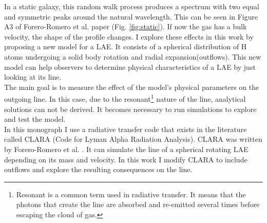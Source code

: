 In a static galaxy, this random walk process produces a spectrum with two equal and symmetric peaks around the natural \lya wavelength. This can be seen in Figure A3 of Forero-Romero et al. paper \cite{CLARA} (Fig. \ref{fig:static}). If now the gas has a bulk velocity, the shape of the \lya profile changes. I explore these effects in this work by proposing a new model for a LAE. It consists of a spherical distribution of H atoms undergoing a solid body rotation and radial expansion(outflows). This new model can help observers to determine physical characteristics of a LAE by just looking at its \lya line. \\

The main goal is to measure the effect of the model's physical parameters on the outgoing \lya line. In this case, due to the resonant\footnote{Resonant is a common term used in radiative transfer. It means that the photons that create the line are absorbed and re-emitted several times before escaping the cloud of gas.} nature of the \lya line, analytical solutions can not be derived. It becomes necessary to run simulations to explore and test the model. \\

In this monograph I use a radiative transfer code that exists in the literature called CLARA (Code for Lyman Alpha Radiation Analysis). CLARA was written by Forero-Romero et al. \cite{CLARA}. It can simulate the \lya line of a spherical rotating LAE depending on its mass and velocity. In this work I modify CLARA to include outflows and explore the resulting consequences on the \lya line. \\